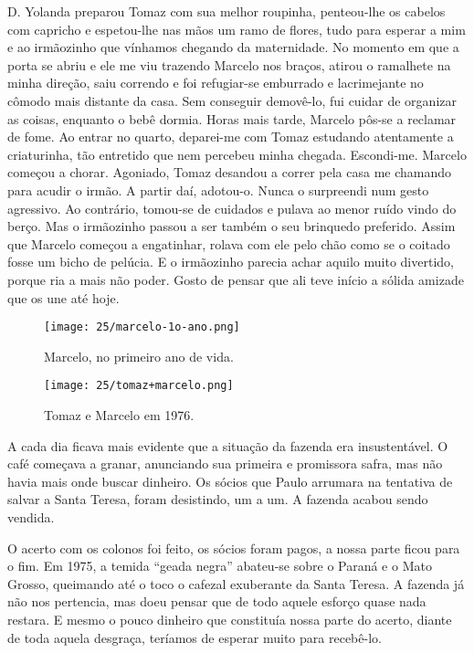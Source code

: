 D. Yolanda preparou Tomaz com sua melhor roupinha, penteou-lhe os cabelos com capricho e espetou-lhe nas mãos um ramo de flores, tudo para esperar a mim e ao irmãozinho que vínhamos chegando da maternidade.
No momento em que a porta se abriu e ele me viu trazendo Marcelo nos braços, atirou o ramalhete na minha direção, saiu correndo e foi refugiar-se emburrado e lacrimejante no cômodo mais distante da casa.
Sem conseguir demovê-lo, fui cuidar de organizar as coisas, enquanto o bebê dormia.
Horas mais tarde, Marcelo pôs-se a reclamar de fome.
Ao entrar no quarto, deparei-me com Tomaz estudando atentamente a criaturinha, tão entretido que nem percebeu minha chegada.
Escondi-me.
Marcelo começou a chorar.
Agoniado, Tomaz desandou a correr pela casa me chamando para acudir o irmão.
A partir daí, adotou-o.
Nunca o surpreendi num gesto agressivo.
Ao contrário, tomou-se de cuidados e pulava ao menor ruído vindo do berço.
Mas o irmãozinho passou a ser também o seu brinquedo preferido.
Assim que Marcelo começou a engatinhar, rolava com ele pelo chão como se o coitado fosse um bicho de pelúcia.
E o irmãozinho parecia achar aquilo muito divertido, porque ria a mais não poder.
Gosto de pensar que ali teve início a sólida amizade que os une até hoje.

\begin{figure}
\centering
\texttt{[image: 25/marcelo-1o-ano.png]}
\caption{Marcelo, no primeiro ano de vida.}
\end{figure}

\begin{figure}
\centering
\texttt{[image: 25/tomaz+marcelo.png]}
\caption{Tomaz e Marcelo em 1976.}
\end{figure}

A cada dia ficava mais evidente que a situação da fazenda era insustentável.
O café começava a granar, anunciando sua primeira e promissora safra, mas não havia mais onde buscar dinheiro.
Os sócios que Paulo arrumara na tentativa de salvar a Santa Teresa, foram desistindo, um a um.
A fazenda acabou sendo vendida.

O acerto com os colonos foi feito, os sócios foram pagos, a nossa parte ficou para o fim.
Em 1975, a temida ``geada negra'' abateu-se sobre o Paraná e o Mato Grosso, queimando até o toco o cafezal exuberante da Santa Teresa.
A fazenda já não nos pertencia, mas doeu pensar que de todo aquele esforço quase nada restara.
E mesmo o pouco dinheiro que constituía nossa parte do acerto, diante de toda aquela desgraça, teríamos de esperar muito para recebê-lo.

